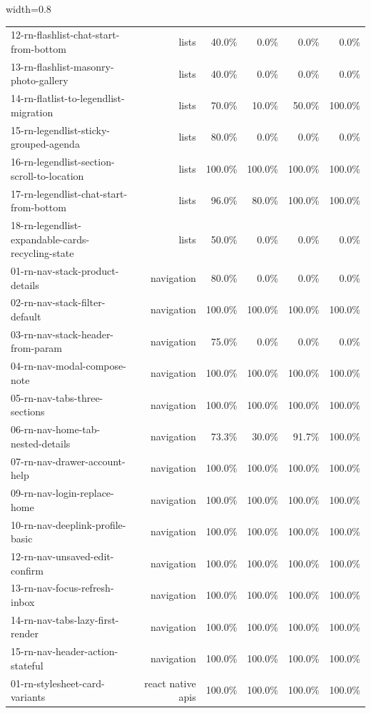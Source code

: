 \begin{table}[htbp]
\begin{adjustbox}{width=0.8\textwidth}
\begin{tabular}{lrrrrr}
12-rn-flashlist-chat-start-from-bottom & lists & 40.0\% & 0.0\% & 0.0\% & 0.0\% \\
13-rn-flashlist-masonry-photo-gallery & lists & 40.0\% & 0.0\% & 0.0\% & 0.0\% \\
14-rn-flatlist-to-legendlist-migration & lists & 70.0\% & 10.0\% & 50.0\% & 100.0\% \\
15-rn-legendlist-sticky-grouped-agenda & lists & 80.0\% & 0.0\% & 0.0\% & 0.0\% \\
16-rn-legendlist-section-scroll-to-location & lists & 100.0\% & 100.0\% & 100.0\% & 100.0\% \\
17-rn-legendlist-chat-start-from-bottom & lists & 96.0\% & 80.0\% & 100.0\% & 100.0\% \\
18-rn-legendlist-expandable-cards-recycling-state & lists & 50.0\% & 0.0\% & 0.0\% & 0.0\% \\
01-rn-nav-stack-product-details & navigation & 80.0\% & 0.0\% & 0.0\% & 0.0\% \\
02-rn-nav-stack-filter-default & navigation & 100.0\% & 100.0\% & 100.0\% & 100.0\% \\
03-rn-nav-stack-header-from-param & navigation & 75.0\% & 0.0\% & 0.0\% & 0.0\% \\
04-rn-nav-modal-compose-note & navigation & 100.0\% & 100.0\% & 100.0\% & 100.0\% \\
05-rn-nav-tabs-three-sections & navigation & 100.0\% & 100.0\% & 100.0\% & 100.0\% \\
06-rn-nav-home-tab-nested-details & navigation & 73.3\% & 30.0\% & 91.7\% & 100.0\% \\
07-rn-nav-drawer-account-help & navigation & 100.0\% & 100.0\% & 100.0\% & 100.0\% \\
09-rn-nav-login-replace-home & navigation & 100.0\% & 100.0\% & 100.0\% & 100.0\% \\
10-rn-nav-deeplink-profile-basic & navigation & 100.0\% & 100.0\% & 100.0\% & 100.0\% \\
12-rn-nav-unsaved-edit-confirm & navigation & 100.0\% & 100.0\% & 100.0\% & 100.0\% \\
13-rn-nav-focus-refresh-inbox & navigation & 100.0\% & 100.0\% & 100.0\% & 100.0\% \\
14-rn-nav-tabs-lazy-first-render & navigation & 100.0\% & 100.0\% & 100.0\% & 100.0\% \\
15-rn-nav-header-action-stateful & navigation & 100.0\% & 100.0\% & 100.0\% & 100.0\% \\
01-rn-stylesheet-card-variants & react native apis & 100.0\% & 100.0\% & 100.0\% & 100.0\% \\

\end{tabular}
\end{adjustbox}
\end{table}
